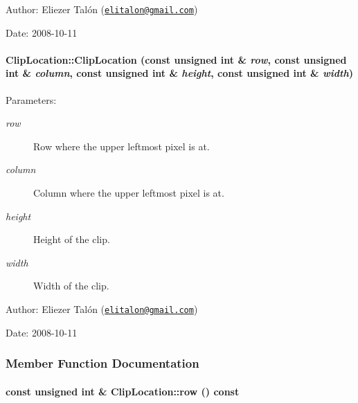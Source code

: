 \begin{Desc}
\item[Author:]Eliezer Talón (\href{mailto:elitalon@gmail.com}{\tt elitalon@gmail.com}) \end{Desc}
\begin{Desc}
\item[Date:]2008-10-11 \end{Desc}
\hypertarget{class_clip_location_b41ff36c161d2d909c6e75474f5f2f31}{
\paragraph[ClipLocation]{\setlength{\rightskip}{0pt plus 5cm}ClipLocation::ClipLocation (const unsigned int \& {\em row}, \/  const unsigned int \& {\em column}, \/  const unsigned int \& {\em height}, \/  const unsigned int \& {\em width})}\hfill}
\label{class_clip_location_b41ff36c161d2d909c6e75474f5f2f31}


\begin{Desc}
\item[Parameters:]
\begin{description}
\item[{\em row}]Row where the upper leftmost pixel is at. \item[{\em column}]Column where the upper leftmost pixel is at. \item[{\em height}]Height of the clip. \item[{\em width}]Width of the clip.\end{description}
\end{Desc}
\begin{Desc}
\item[Author:]Eliezer Talón (\href{mailto:elitalon@gmail.com}{\tt elitalon@gmail.com}) \end{Desc}
\begin{Desc}
\item[Date:]2008-10-11 \end{Desc}


\subsubsection{Member Function Documentation}
\hypertarget{class_clip_location_8816c925e80c2e55bbbbdd6da799f53f}{
\paragraph[row]{\setlength{\rightskip}{0pt plus 5cm}const unsigned int \& ClipLocation::row () const}\hfill}
\label{class_clip_location_8816c925e80c2e55bbbbdd6da799f53f}


